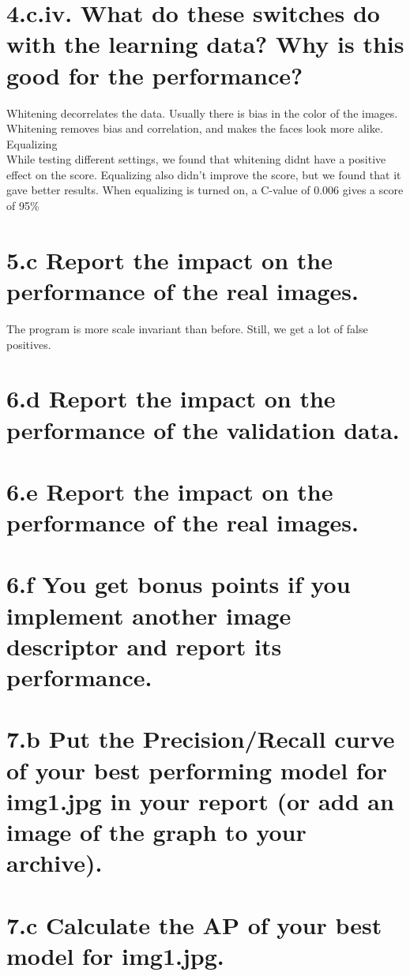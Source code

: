 \documentclass[paper=a4, fontsize=11pt]{scrartcl} %
\numberwithin{equation}{section} %
\numberwithin{figure}{section} %
\numberwithin{table}{section} %
\begin{document}
\section*{4.c.iv. What do these switches do with the learning data? Why is this good for the performance?}
Whitening decorrelates the data. Usually there is bias in the color of the images. Whitening removes bias and correlation, and makes the faces look more alike.\\
Equalizing \\
While testing different settings, we found that whitening didnt have a positive effect on the score. Equalizing also didn't improve the score, but we found that it gave better results. When equalizing is turned on, a C-value of 0.006 gives a score of 95\% \\
\section*{5.c Report the impact on the performance of the real images.}
The program is more scale invariant than before. Still, we get a lot of false positives.
\section*{6.d Report the impact on the performance of the validation data.}
\section*{6.e Report the impact on the performance of the real images.}
\section*{6.f You get bonus points if you implement another image descriptor and report its performance.}
\section*{7.b Put the Precision/Recall curve of your best performing model for img1.jpg in your report (or add an image of the graph to your archive).}
\section*{7.c Calculate the AP of your best model for img1.jpg.}
\end{document}
